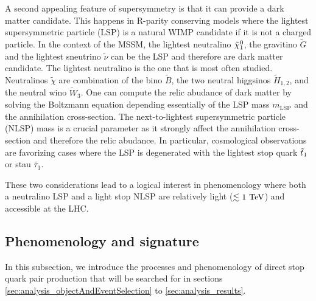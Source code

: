 

        A second appealing feature of supersymmetry is that it can provide a dark matter 
        candidate. This happens in R-parity conserving models where the lightest supersymmetric
        particle (LSP) is a natural WIMP candidate if it is not a charged particle. In the
        context of the MSSM, the lightest neutralino $\tilde{\chi}_1^0$, the gravitino $\tilde{G}$
        and the lightest sneutrino $\tilde{\nu}$ can be the LSP and therefore are dark matter
        candidate. The lightest neutralino is the one that is most often studied. Neutralinos
        $\tilde{\chi}$ are combination of the bino $\tilde{B}$, the two neutral higgsinos 
        $\tilde{H}_{1,2}$, and the neutral wino $\tilde{W}_3$. One can compute the relic
        abudance of dark matter by solving the Boltzmann equation \cite{EllisDarkMatter}
        depending essentially of the LSP mass $m_{\text{LSP}}$ and the annihilation cross-section.
        The next-to-lightest supersymmetric particle (NLSP) mass is a crucial parameter as 
        it strongly affect the annihilation cross-section and therefore the relic abudance. 
        In particular, cosmological observations are favorizing cases where the LSP is 
        degenerated with the lightest stop quark $\tilde{t}_1$ or stau $\tilde{\tau_1}$.
        
        These two considerations lead to a logical interest in phenomenology where both a 
        neutralino LSP and a light stop NLSP are relatively light ($\lesssim 1~\text{TeV}$) and 
        accessible at the LHC.

        \subsection{Phenomenology and signature}

        In this subsection, we introduce the processes and phenomenology of direct stop 
        quark pair production that will be searched for in sections 
        \ref{sec:analysis_objectAndEventSelection} to \ref{sec:analysis_results}.
        
